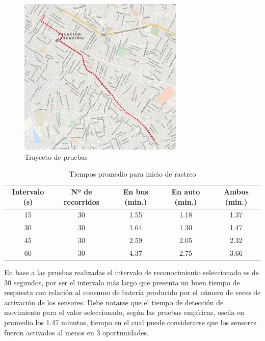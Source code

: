 \begin{figure}[!htb]
	\centering
	\includegraphics[width=0.7\textwidth]{capitulos/7/figuras/trayecto.png}
	\caption{\label{fig:trayecto} Trayecto de pruebas}	
\end{figure}

\begin{table}[h]
  \centering
	\begin{tabular}{ccccc}
	\toprule
	Intervalo (s) & Nº de recorridos & En bus (min.) & En auto (min.) & Ambos (min.) \\
	\midrule
	15            & 30       & 1.55         & 1.18            & 1.37         \\
	30            & 30       & 1.64         & 1.30            & 1.47         \\
	45            & 30       & 2.59         & 2.05            & 2.32         \\
	60            & 30       & 4.37         & 2.75            & 3.66         \\
	\bottomrule
	\end{tabular}
  \caption{Tiempos promedio para inicio de rastreo}
  \label{tab:prom_intervalo_reconocimiento}
\end{table}

En base a las pruebas realizadas el intervalo de reconocimiento seleccionado es de 30 segundos, por ser el intervalo más largo que presenta un buen tiempo de respuesta con relación al consumo de batería producido por el número de veces de activación de los sensores. Debe notarse que el tiempo de detección de movimiento para el valor seleccionado, según las pruebas empíricas, oscila en promedio los 1.47 minutos, tiempo en el cual puede considerarse que los sensores fueron activados al menos en 3 oportunidades.

